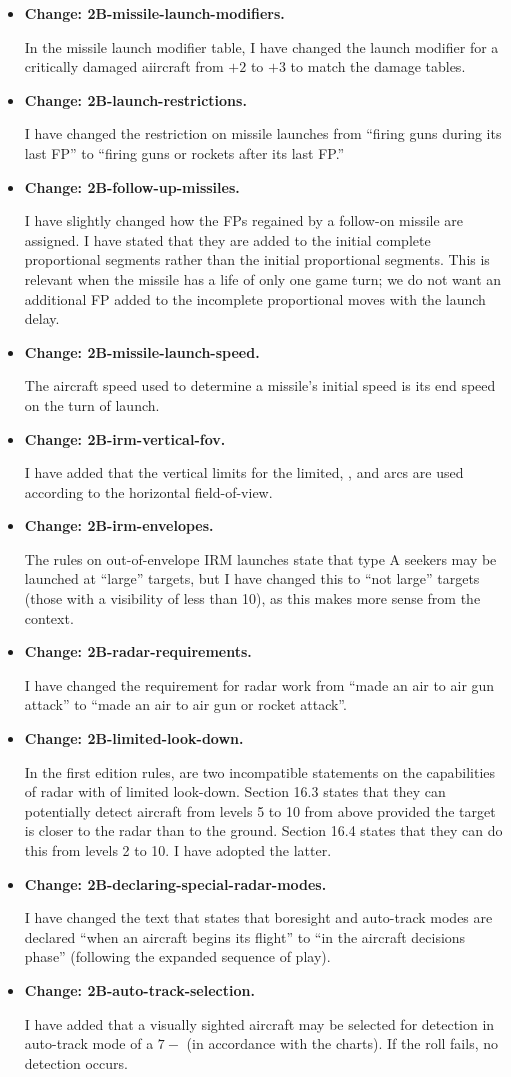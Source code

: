 \documentclass[10pt]{report}
\newcommand{\itemtag}[1]{\item \textbf{Change: #1.}\par}
\begin{document}
\begin{itemize}
    \itemtag{2B-missile-launch-modifiers} In the missile launch modifier table, I have changed the launch modifier for a critically damaged aiircraft from $+2$ to $+3$ to match the damage tables.
    
    \itemtag{2B-launch-restrictions} I have changed the restriction on missile launches from “firing guns during its last FP” to “firing guns or rockets after its last FP.”

    \itemtag{2B-follow-up-missiles} I have slightly changed how the FPs regained by a follow-on missile are assigned. I have stated that they are added to the initial complete proportional segments rather than the initial proportional segments. This is relevant when the missile has a life of only one game turn; we do not want an additional FP added to the incomplete proportional moves with the launch delay.
    
    \itemtag{2B-missile-launch-speed} The aircraft speed used to determine a missile's initial speed is its end speed on the turn of launch.
    
    \itemtag{2B-irm-vertical-fov} I have added that the vertical limits for the limited, , and  arcs are used according to the horizontal field-of-view.

    \itemtag{2B-irm-envelopes} The rules on out-of-envelope IRM launches state that type A seekers may be launched at “large” targets, but I have changed this to “not large” targets (those with a visibility of less than 10), as this makes more sense from the context.

    \itemtag{2B-radar-requirements} I have changed the requirement for radar work from “made an air to air gun attack” to “made an air to air gun or rocket attack”.
    
    \itemtag{2B-limited-look-down} In the first edition rules, are two incompatible statements on the capabilities of radar with of limited look-down. Section 16.3 states that they can potentially detect aircraft from levels 5 to 10 from above provided the target is closer to the radar than to the ground. Section 16.4 states that they can do this from levels 2 to 10. I have adopted the latter.

    \itemtag{2B-declaring-special-radar-modes} I have changed the text that states that boresight and auto-track modes are declared “when an aircraft begins its flight” to “in the aircraft decisions phase” (following the expanded sequence of play).

    \itemtag{2B-auto-track-selection} I have added that a visually sighted aircraft may be selected for detection in auto-track mode of a $7-$ (in accordance with the charts). If the roll fails, no detection occurs.


\end{itemize}
\end{document}

